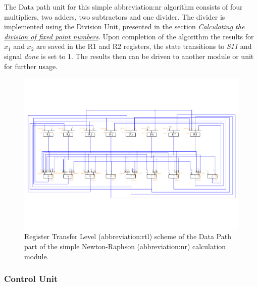 \documentclass[a4paper, twoside, 11pt]{article}
\newcommand{\fbar}{\FloatBarrier}
\begin{document}
            The Data path unit for this simple \gls{abbreviation:nr} algorithm consists of four multipliers, two adders, two subtractors and one divider. The divider is implemented using the Division Unit, presented in the section \hyperref[sec:calculating-the-division-of-fixed-point-numbers]{\textit{Calculating the division of fixed point numbers}}. Upon completion of the algorithm the results for $x_1$ and $x_2$ are saved in the R1 and R2 registers, the state transitions to \textit{S11} and signal \textit{done} is set to 1. The results then can be driven to another module or unit for further usage.
            \begin{figure}[htbp!]
                \centering
                \includegraphics[width=1\textwidth]{src/pdf/simple-nr-rtl.pdf}
                \caption{Register Transfer Level (\gls{abbreviation:rtl}) scheme of the Data Path part of the simple Newton-Raphson (\gls{abbreviation:nr}) calculation module.}
                \label{fig:simple-nr-rtl}
                \end{figure}

        \fbar
        \subsubsection{Control Unit}\label{subsubsec:simple-nr-control-unit}
\end{document}

